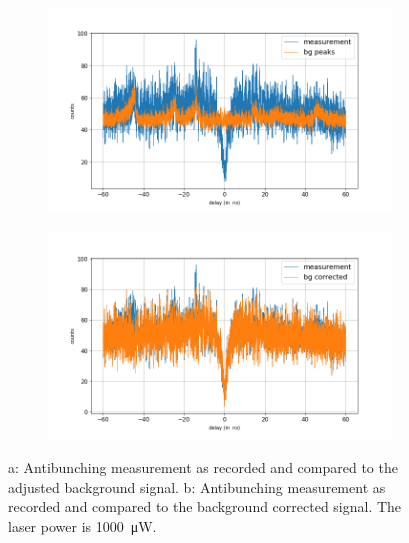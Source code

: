 \begin{figure}[!ht]
    \centering
    \begin{subfigure}{0.47\textwidth}
        \centering
        \includegraphics[width=1.0\textwidth]{img/output_t2/1000.0muW_bg_peaks.png}
    \caption{}
    \end{subfigure}
    \begin{subfigure}{0.47\textwidth}
        \centering
        \includegraphics[width=\textwidth]{img/output_t2/1000.0muW_bg_vgl.png}
        \caption{}
    \end{subfigure}
    \caption{a: Antibunching measurement as recorded and compared to the adjusted background signal. b: Antibunching measurement as recorded and compared to the background corrected signal. The laser power is \SI{1000}{\micro W}.} %
\end{figure}

